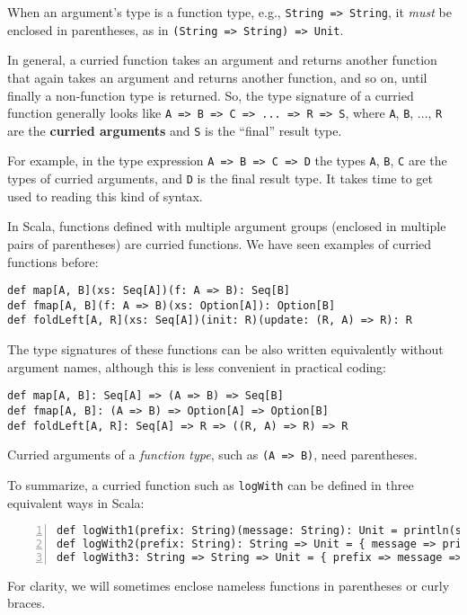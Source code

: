 When an argument\textsf{'}s type is a function type, e.g., \lstinline!String => String!,
it \emph{must} be enclosed in parentheses, as in \lstinline!(String => String) => Unit!.

In general, a curried function takes an argument and returns another
function that again takes an argument and returns another function,
and so on, until finally a non-function type is returned. So, the
type signature of a curried function generally looks like \lstinline!A => B => C => ... => R => S!,
where \lstinline!A!, \lstinline!B!, ..., \lstinline!R! are the
\textbf{curried arguments} and \lstinline!S!
is the \textsf{``}final\textsf{''} result type.

For example, in the type expression \lstinline!A => B => C => D!
the types \lstinline!A!, \lstinline!B!, \lstinline!C! are the types
of curried arguments, and \lstinline!D! is the final result type.
It takes time to get used to reading this kind of syntax.

In Scala, functions defined with multiple argument groups (enclosed
in multiple pairs of parentheses) are curried functions. We have seen
examples of curried functions before:
\begin{lstlisting}
def map[A, B](xs: Seq[A])(f: A => B): Seq[B]
def fmap[A, B](f: A => B)(xs: Option[A]): Option[B]
def foldLeft[A, R](xs: Seq[A])(init: R)(update: (R, A) => R): R
\end{lstlisting}
The type signatures of these functions can be also written equivalently
without argument names, although this is less convenient in practical
coding:
\begin{lstlisting}
def map[A, B]: Seq[A] => (A => B) => Seq[B]
def fmap[A, B]: (A => B) => Option[A] => Option[B]
def foldLeft[A, R]: Seq[A] => R => ((R, A) => R) => R
\end{lstlisting}
Curried arguments of a \emph{function type}, such as \lstinline!(A => B)!,
need parentheses.

To summarize, a curried function such as \lstinline!logWith! can
be defined in three equivalent ways in Scala:
\begin{lstlisting}[numbers=left]
def logWith1(prefix: String)(message: String): Unit = println(s"$prefix: $message")
def logWith2(prefix: String): String => Unit = { message => println(s"$prefix: $message") }
def logWith3: String => String => Unit = { prefix => message => println(s"$prefix: $message") }
\end{lstlisting}
For clarity, we will sometimes enclose nameless functions in parentheses
or curly braces. 

